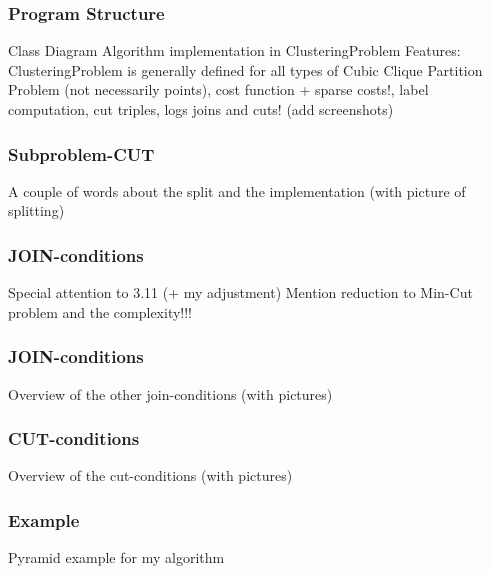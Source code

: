 \begin{frame}
    \frametitle{Program Structure}
    Class Diagram
    Algorithm implementation in ClusteringProblem
    Features: ClusteringProblem is generally defined for all types of Cubic Clique Partition Problem (not necessarily points),
        cost function + sparse costs!, label computation, cut triples,
        logs joins and cuts! (add screenshots)
\end{frame}


\begin{frame}
    \frametitle{Subproblem-CUT}
    A couple of words about the split and the implementation
    (with picture of splitting)
\end{frame}


\begin{frame}
    \frametitle{JOIN-conditions}
    Special attention to 3.11 (+ my adjustment)
    Mention reduction to Min-Cut problem and the complexity!!!
\end{frame}


\begin{frame}
    \frametitle{JOIN-conditions}
    Overview of the other join-conditions (with pictures)
\end{frame}

\begin{frame}
    \frametitle{CUT-conditions}
    Overview of the cut-conditions (with pictures)
\end{frame}

\begin{frame}
    \frametitle{Example}
    Pyramid example for my algorithm
\end{frame}